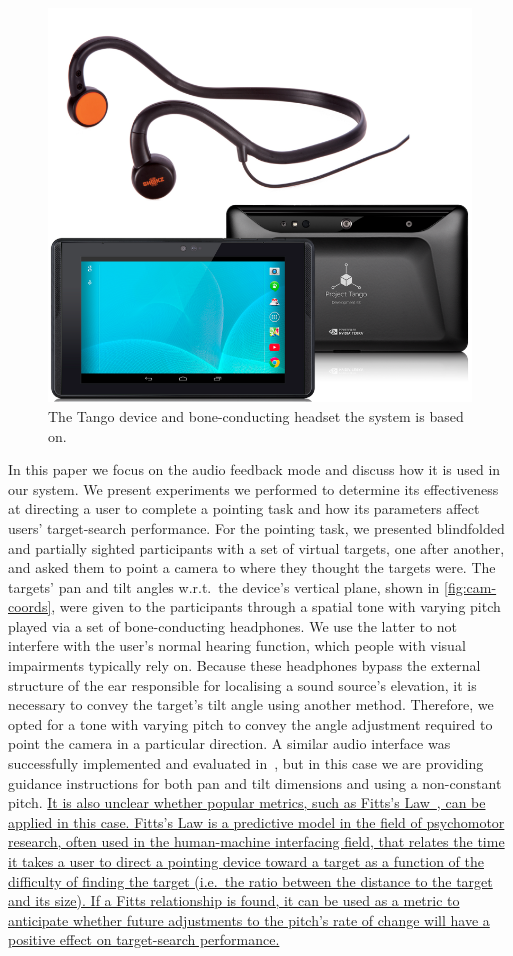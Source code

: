 \documentclass[sigconf, screen=true, anonymous=true]{acmart}
\begin{document}
\begin{figure}
  \centering
  \includegraphics[width=0.5\columnwidth]{figures/tango_headphone.png}
  \caption{The Tango device and bone-conducting headset the system is based on. }\label{fig:tango-headphone}
\end{figure}

In this paper we focus on the audio feedback mode and discuss how it is used in our system.
We present experiments we performed to determine its effectiveness at directing a user to complete a pointing task and how its parameters affect users' target-search performance.
For the pointing task, we presented blindfolded and partially sighted participants with a set of virtual targets, one after another, and asked them to point a camera to where they thought the targets were.
The targets' pan and tilt angles w.r.t.\ the device's vertical plane, shown in \cref{fig:cam-coords}, were given to the participants through a spatial tone with varying pitch played via a set of bone-conducting headphones.
We use the latter to not interfere with the user's normal hearing function, which people with visual impairments typically rely on.
Because these headphones bypass the external structure of the ear responsible for localising a sound source's elevation, it is necessary to convey the target's tilt angle using another method.
Therefore, we opted for a tone with varying pitch to convey the angle adjustment required to point the camera in a particular direction.
A similar audio interface was successfully implemented and evaluated in~\cite{durette2008visuo}, but in this case we are providing guidance instructions for both pan and tilt dimensions and using a non-constant pitch.
\uline{It is also unclear whether popular metrics, such as Fitts's Law~\cite{fitts1954information}, can be applied in this case.
Fitts's Law is a predictive model in the field of psychomotor research, often used in the human-machine interfacing field, that relates the time it takes a user to direct a pointing device toward a target as a function of the difficulty of finding the target (i.e.\ the ratio between the distance to the target and its size).
If a Fitts relationship is found, it can be used as a metric to anticipate whether future adjustments to the pitch's rate of change will have a positive effect on target-search performance.}
\end{document}
